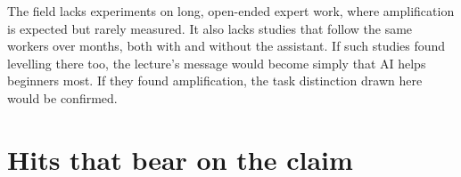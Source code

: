 The field lacks experiments on long, open-ended expert work, where
amplification is expected but rarely measured. It also lacks studies
that follow the same workers over months, both with and without the
assistant. If such studies found levelling there too, the lecture's
message would become simply that AI helps beginners most. If they found
amplification, the task distinction drawn here would be confirmed.

\section{Hits that bear on the claim}
\label{who-gains:hits}


